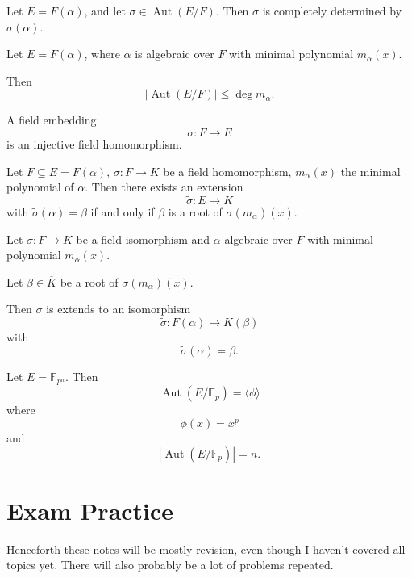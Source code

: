 \begin{prop}
    Let $E = F(\alpha)$, and let $\sigma \in \operatorname{Aut}(E/F)$.
    Then $\sigma$ is completely determined by $\sigma(\alpha)$.
\end{prop}

\begin{thm}
    Let $E = F(\alpha)$, where $\alpha$ is algebraic over 
    $F$ with minimal polynomial $m_\alpha(x)$. 

    Then 
    \[
        |\operatorname{Aut}(E/F)| \leq \deg m_\alpha.
    \]
\end{thm}
\begin{defn}
    A field embedding 
    \[
        \sigma : F \to E
    \]
    is an injective field homomorphism.
\end{defn}

\begin{thm}
    Let $F \subseteq E = F(\alpha)$, $\sigma : F \to K$ be 
    a field homomorphism, $m_\alpha(x)$ the minimal 
    polynomial of $\alpha$.
    Then there exists an extension 
    \[
        \widetilde\sigma : E \to K
    \]
    with $\widetilde\sigma(\alpha) = \beta$ if and only if 
    $\beta$ is a root of $\sigma(m_\alpha)(x)$.
\end{thm}

\begin{thm}
    Let $\sigma : F \to K$ be a field isomorphism and 
    $\alpha$ algebraic over $F$ with minimal polynomial 
    $m_\alpha(x)$.

    Let $\beta \in \overline K$ be a root of 
    $\sigma(m_\alpha)(x)$. 

    Then $\sigma$ is extends to an isomorphism 
    \[
        \widetilde \sigma : F(\alpha) \to K(\beta)
    \]
    with 
    \[
        \widetilde \sigma(\alpha) = \beta.
    \]
\end{thm}
\begin{thm}
    Let $E = \mathbb F_{p^n}$. Then 
    \[
        \operatorname{Aut}(E/\mathbb F_p) = \langle 
        \phi \rangle
    \]
    where 
    \[
        \phi(x) = x^p
    \]
    and 
    \[
        |\operatorname{Aut}(E/\mathbb F_p)| = n.
    \]
\end{thm}

\section{Exam Practice}
Henceforth these notes will be mostly revision, 
even though I haven't covered all topics yet. 
There will also probably be a lot of problems repeated.

